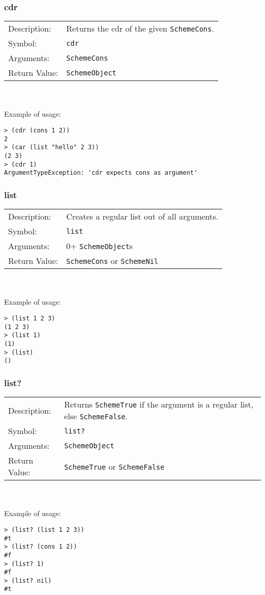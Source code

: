 \documentclass[12pt,a4paper]{scrartcl}
\begin{document}
\subsubsection{cdr}
\begin{tabular}{l  p{13cm}}
Description: & Returns the cdr of the given \lstinline{SchemeCons}.\\
Symbol: & \lstinline{cdr}\\
Arguments: & \lstinline{SchemeCons}\\
Return Value: & \lstinline{SchemeObject}
\end{tabular}
\\
\\
Example of usage:
\begin{lstlisting}
> (cdr (cons 1 2))
2
> (car (list "hello" 2 3))
(2 3)
> (cdr 1)
ArgumentTypeException: 'cdr expects cons as argument'   
\end{lstlisting}


\subsubsection{list}
\begin{tabular}{l  p{13cm}}
Description: & Creates a regular list out of all arguments.\\
Symbol: & \lstinline{list}\\
Arguments: & 0+ \lstinline{SchemeObject}s\\
Return Value: & \lstinline{SchemeCons} or \lstinline{SchemeNil}
\end{tabular}
\\
\\
Example of usage:
\begin{lstlisting}
> (list 1 2 3)
(1 2 3)
> (list 1)
(1)
> (list)
()
\end{lstlisting}


\subsubsection{list?}
\begin{tabular}{l  p{13cm}}
Description: & Returns \lstinline{SchemeTrue} if the argument is a regular list, else \lstinline{SchemeFalse}.\\
Symbol: & \lstinline{list?}\\
Arguments: & \lstinline{SchemeObject}\\
Return Value: & \lstinline{SchemeTrue} or \lstinline{SchemeFalse}
\end{tabular}
\\
\\
Example of usage:
\begin{lstlisting}
> (list? (list 1 2 3))
#t
> (list? (cons 1 2))
#f
> (list? 1)
#f
> (list? nil)
#t
\end{lstlisting}
\end{document}

